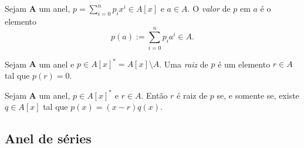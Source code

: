\begin{definition}
Sejam $\bm A$ um anel, $p = \sum_{i=0}^n p_ix^i \in A[x]$ e $a \in A$. O \emph{valor} de $p$ em $a$ é o elemento
	\begin{equation*}
	p(a) := \sum_{i=0}^n p_ia^i \in A.
	\end{equation*}
\end{definition}

\begin{definition}
Sejam $\bm A$ um anel e $p \in A[x]^* = A[x] \setminus A$. Uma \emph{raiz} de $p$ é um elemento $r \in A$ tal que $p(r)=0$.
\end{definition}

\begin{exercise}
Sejam $\bm A$ um anel, $p \in A[x]^*$ e $r \in A$. Então $r$ é raiz de $p$ se, e somente se, existe $q \in A[x]$ tal que $p(x)=(x-r)q(x)$.
\end{exercise}
%



\cleardoublepage

\subsection{Anel de séries}

